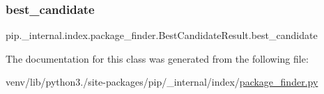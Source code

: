 \subsubsection{\texorpdfstring{best\+\_\+candidate}{best\_candidate}}
{\footnotesize\ttfamily pip.\+\_\+internal.\+index.\+package\+\_\+finder.\+Best\+Candidate\+Result.\+best\+\_\+candidate\hspace{0.3cm}{\ttfamily [static]}}



The documentation for this class was generated from the following file\+:\begin{DoxyCompactItemize}
\item 
venv/lib/python3./site-\/packages/pip/\+\_\+internal/index/\hyperlink{package__finder_8py}{package\+\_\+finder.\+py}\end{DoxyCompactItemize}
